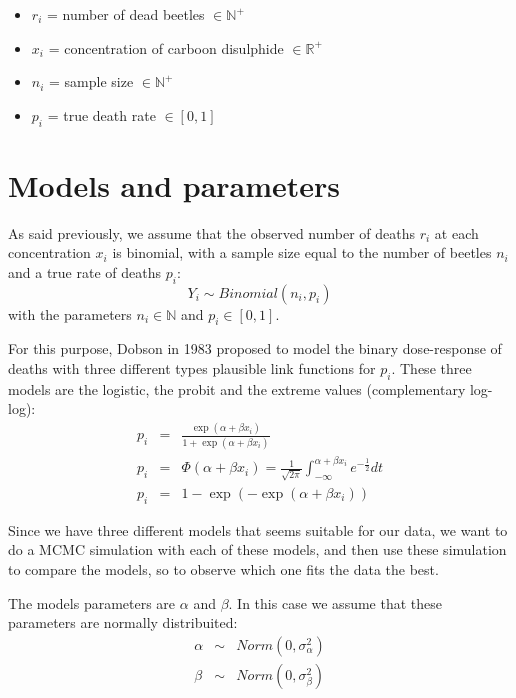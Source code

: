 \documentclass[]{article}
\providecommand{\tightlist}{%
  \setlength{\itemsep}{0pt}\setlength{\parskip}{0pt}}
\begin{document}
\begin{itemize}
\tightlist
\item
  \(r_i\) = number of dead beetles \(\in \mathbb{N}^+\)
\item
  \(x_i\) = concentration of carboon disulphide \(\in \mathbb{R}^+\)
\item
  \(n_i\) = sample size \(\in \mathbb{N}^+\)
\item
  \(p_i\) = true death rate \(\in[0,1]\)
\end{itemize}

\hypertarget{models-and-parameters}{%
\section{Models and parameters}\label{models-and-parameters}}

As said previously, we assume that the observed number of deaths \(r_i\)
at each concentration \(x_i\) is binomial, with a sample size equal to
the number of beetles \(n_i\) and a true rate of deaths \(p_i\):
\[Y_i \sim Binomial(n_i, p_i)\] with the parameters
\(n_i \in \mathbb{N}\) and \(p_i \in [0,1]\).

For this purpose, Dobson in 1983 proposed to model the binary
dose-response of deaths with three different types plausible link
functions for \(p_i\). These three models are the logistic, the probit
and the extreme values (complementary log-log): \begin{eqnarray*}
  p_i &=& \frac{\exp(\alpha + \beta x_i)}{1 + \exp(\alpha + \beta x_i)}\\
  p_i &=& \Phi(\alpha + \beta x_i) = \frac{1}{\sqrt{2\pi}}\int _{-\infty }^{\alpha + \beta x_i}e^{-\frac{1}{2}}dt\\
  p_i &=& 1 - \exp(- \exp(\alpha + \beta x_i))
\end{eqnarray*}

Since we have three different models that seems suitable for our data,
we want to do a MCMC simulation with each of these models, and then use
these simulation to compare the models, so to observe which one fits the
data the best.

The models parameters are \(\alpha\) and \(\beta\). In this case we
assume that these parameters are normally distribuited:
\begin{eqnarray*}
  \alpha &\sim& Norm(0,\sigma^{2}_{\alpha})\\
  \beta &\sim& Norm(0,\sigma^{2}_{\beta})
\end{eqnarray*}
\end{document}
